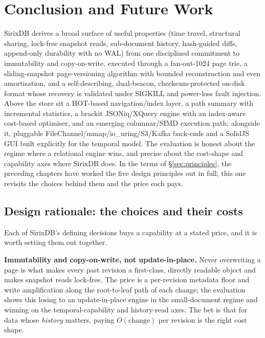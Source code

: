 \documentclass[11pt,a4paper,oneside]{report}
\theoremstyle{sirixthm}
\begin{document}
\chapter{Conclusion and Future Work}
\label{ch:conclusion}

SirixDB derives a broad surface of useful properties (time travel, structural sharing,
lock-free snapshot reads, sub-document history, hash-guided diffs, append-only durability with
no WAL) from one disciplined commitment to immutability and copy-on-write, executed through a
fan-out-1024 page trie, a sliding-snapshot page-versioning algorithm with bounded
reconstruction and even amortisation, and a self-describing, dual-beacon, checksum-protected
on-disk format whose recovery is validated under SIGKILL and power-loss fault injection. Above
the store sit a HOT-based navigation/index layer, a path summary with incremental statistics, a
brackit JSONiq/XQuery engine with an index-aware cost-based optimiser, and an emerging
columnar/SIMD execution path; alongside it, pluggable FileChannel/mmap/io\_uring/S3/Kafka
back-ends and a SolidJS GUI built explicitly for the temporal model. The evaluation is honest
about the regime where a relational engine wins, and precise about the cost-shape and
capability axes where SirixDB does. In the terms of \S\ref{sec:principles}, the preceding chapters have
worked the five design principles out in full; this one revisits the choices behind them and the price
each pays.

\section{Design rationale: the choices and their costs}

Each of SirixDB's defining decisions buys a capability at a stated price, and it is worth setting them
out together.

\textbf{Immutability and copy-on-write, not update-in-place.} Never overwriting a page is what makes
every past revision a first-class, directly readable object and makes snapshot reads lock-free. The
price is a per-revision metadata floor and write amplification along the root-to-leaf path of each
change; the evaluation shows this losing to an update-in-place engine in the small-document regime and
winning on the temporal-capability and history-read axes. The bet is that for data whose \emph{history}
matters, paying $O(\text{change})$ per revision is the right cost shape.
\end{document}

